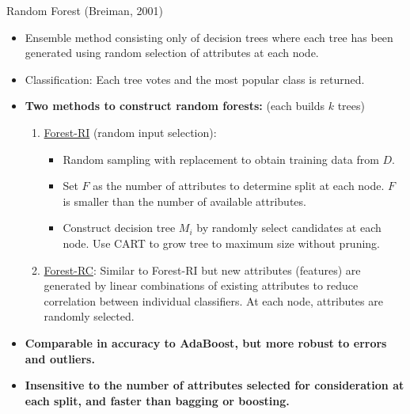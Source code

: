 \begin{frame}{Random Forest (Breiman, 2001)}
	\begin{itemize}
		\item Ensemble method consisting only of decision trees where each tree has been generated using random selection of attributes at each node.
		\item Classification: Each tree votes and the most popular class is returned.
		\item \textbf{Two methods to construct random forests:} (each builds $k$ trees)
		      \begin{enumerate}
			      \item \underline{Forest-RI} (random input selection):
			            \begin{itemize}
				            \item Random sampling with replacement to obtain training data from $D$.
				            \item Set $F$ as the number of attributes to determine split at each node. $F$ is smaller than the number of available attributes.
				            \item Construct decision tree $M_i$ by randomly select candidates at each node. Use CART to grow tree to maximum size without pruning.
			            \end{itemize}
			      \item \underline{Forest-RC}: Similar to Forest-RI but new attributes (features) are generated by linear combinations of existing attributes to reduce correlation between individual classifiers. At each node, attributes are randomly selected.

		      \end{enumerate}
		\item \textbf{Comparable in accuracy to AdaBoost, but more robust to errors and outliers.}
		\item \textbf{Insensitive to the number of attributes selected for consideration at each split, and faster than bagging or boosting.}
	\end{itemize}
\end{frame}

